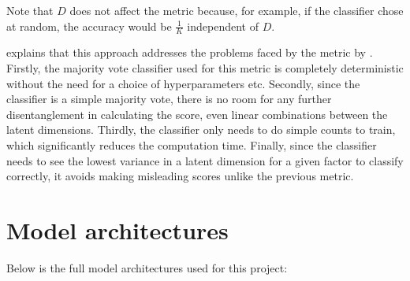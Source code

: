         Note that $D$ does not affect the metric because, for example, if the classifier chose at random, the accuracy would be $\frac{1}{K}$ independent of $D$.
        
        \cite{kim2018disentangling} explains that this approach addresses the problems faced by the metric by \cite{higgins2017beta}. Firstly, the majority vote classifier used for this metric is completely deterministic without the need for a choice of hyperparameters etc. Secondly, since the classifier is a simple majority vote, there is no room for any further disentanglement in calculating the score, even linear combinations between the latent dimensions. Thirdly, the classifier only needs to do simple counts to train, which significantly reduces the computation time. Finally, since the classifier needs to see the lowest variance in a latent dimension for a given factor to classify correctly, it avoids making misleading scores unlike the previous metric.
        
    \section{Model architectures}
        Below is the full model architectures used for this project:
        
